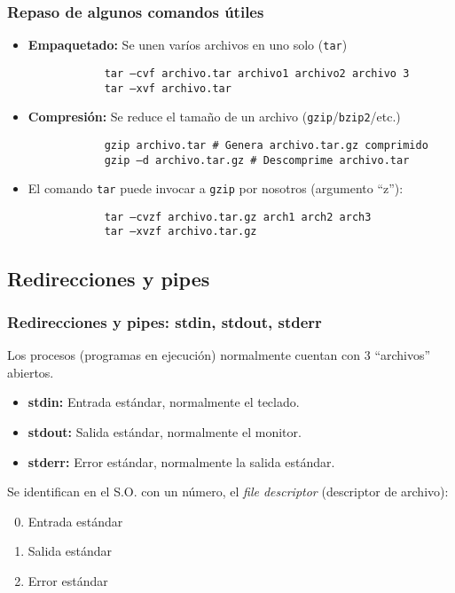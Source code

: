\begin{frame}[fragile]
	\frametitle{Repaso de algunos comandos útiles}
	\begin{itemize}
		\item \textbf{Empaquetado:} Se unen varíos archivos en uno solo (\texttt{tar})
		\begin{lstlisting}
			tar –cvf archivo.tar archivo1 archivo2 archivo 3
			tar –xvf archivo.tar
		\end{lstlisting}
		\item \textbf{Compresión:} Se reduce el tamaño de un archivo (\texttt{gzip}/\texttt{bzip2}/etc.)
		\begin{lstlisting}
			gzip archivo.tar # Genera archivo.tar.gz comprimido
			gzip –d archivo.tar.gz # Descomprime archivo.tar
		\end{lstlisting}
		\item El comando \texttt{tar} puede invocar a \texttt{gzip} por nosotros (argumento ``z''):
		\begin{lstlisting}
			tar –cvzf archivo.tar.gz arch1 arch2 arch3
			tar –xvzf archivo.tar.gz
		\end{lstlisting}	
	\end{itemize}
\end{frame}

\subsection{Redirecciones y pipes}
\begin{frame}
	\frametitle{Redirecciones y pipes: stdin, stdout, stderr}
	Los procesos (programas en ejecución) normalmente cuentan con 3 ``archivos'' abiertos.
	\begin{itemize}
		\item \textbf{stdin:} Entrada estándar, normalmente el teclado.
		\item \textbf{stdout:} Salida estándar, normalmente el monitor.
		\item \textbf{stderr:} Error estándar, normalmente la salida
          estándar.
	\end{itemize}
	Se identifican en el S.O. con un número, el \alert{\textit{file
        descriptor}} (descriptor de archivo):
	\begin{enumerate}
		\setcounter{enumi}{-1}
		\item Entrada estándar
		\item Salida estándar
		\item Error estándar
	\end{enumerate}
\end{frame}

